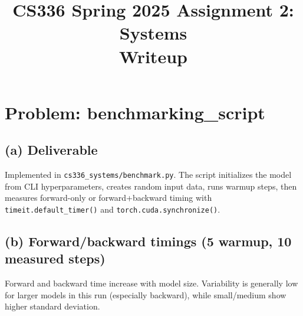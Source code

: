 \documentclass[11pt]{article}
\title{CS336 Spring 2025 Assignment 2: Systems\\Writeup}
\author{}
\date{}
\begin{document}
\maketitle
\tableofcontents

\section{Problem: benchmarking\_script}
\subsection*{(a) Deliverable}
Implemented in \texttt{cs336\_systems/benchmark.py}. The script initializes the model from CLI hyperparameters, creates random input data, runs warmup steps, then measures forward-only or forward+backward timing with \texttt{timeit.default\_timer()} and \texttt{torch.cuda.synchronize()}.

\subsection*{(b) Forward/backward timings (5 warmup, 10 measured steps)}
\begin{table}[h]
\centering
{}
\caption{Part (b) benchmark results on CUDA (A100 40GB).}
\end{table}

Forward and backward time increase with model size. Variability is generally low for larger models in this run (especially backward), while small/medium show higher standard deviation.
\end{document}
